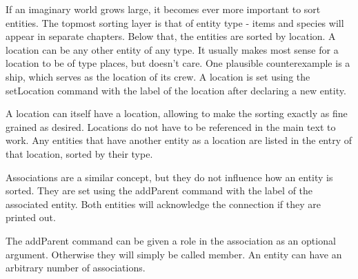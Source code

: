 \documentclass[openany]{book}
\begin{document}
If an imaginary world grows large, it becomes ever more important to sort entities. The topmost sorting layer is that of entity type - items and species will appear in separate chapters. Below that, the entities are sorted by location. A location can be any other entity of any type. It usually makes most sense for a location to be of type places, but \LoreTex{} doesn't care. One plausible counterexample is a ship, which serves as the location of its crew. A location is set using the setLocation command with the label of the location after declaring a new entity.

A location can itself have a location, allowing to make the sorting exactly as fine grained as desired. Locations do not have to be referenced in the main text to work. Any entities that have another entity as a location are listed in the entry of that location, sorted by their type.








Associations are a similar concept, but they do not influence how an entity is sorted. They are set using the addParent command with the label of the associated entity. Both entities will acknowledge the connection if they are printed out.

The addParent command can be given a role in the association as an optional argument. Otherwise they will simply be called member. An entity can have an arbitrary number of associations.









\automatedChapters{}
\end{document}
